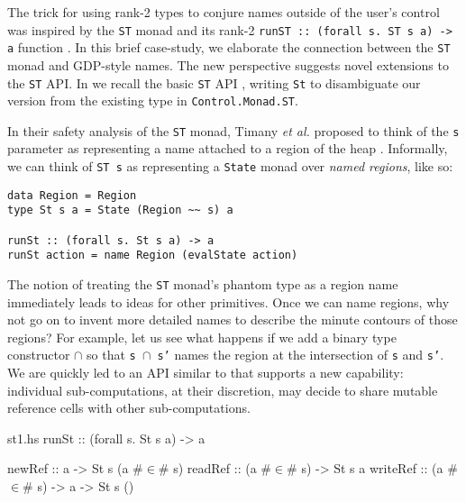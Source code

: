 \documentclass[format=sigplan, review=false, screen=true, 10pt]{acmart}
\makeatletter
\let\origsection\section
\renewcommand\section{\@ifstar{\starsection}{\nostarsection}}
\newcommand\nostarsection[1]
{\sectionprelude\origsection{#1}\sectionpostlude}
\newcommand\starsection[1]
{\sectionprelude\origsection*{#1}\sectionpostlude}
\newcommand\sectionprelude{%
  \vspace{-0.5em}
}
\newcommand\sectionpostlude{%
  \vspace{0em}
}
\makeatother
\begin{document}

\section{Case Study \#2: Sharing state threads}
The trick for using rank-2 types to conjure names outside of the user's control was
inspired by the \texttt{ST} monad and its rank-2 \texttt{runST :: (forall s. ST s a) -> a}
function \cite{launchbury1994lazy}. In this brief case-study, we elaborate the connection
between the \texttt{ST} monad and GDP-style names. The new perspective suggests novel
extensions to the \texttt{ST} API.
In  we recall the basic \texttt{ST} API \cite{launchbury1994lazy}, writing \texttt{St} to
disambiguate our version from the existing type in \texttt{Control.Monad.ST}.

In their safety analysis of the \texttt{ST} monad, Timany \textit{et al.} proposed to think of the \texttt{s} parameter as
representing a name attached to a region of the heap \cite{timany2017logical}.
Informally, we can think of \texttt{ST s} as representing a \texttt{State} monad over
\emph{named regions}, like so:
\begin{verbatim}
data Region = Region
type St s a = State (Region ~~ s) a

runSt :: (forall s. St s a) -> a
runSt action = name Region (evalState action)
\end{verbatim}

The notion of treating the \texttt{ST} monad's phantom type as a region name immediately leads to ideas for
other primitives. Once we can name regions, why not go on to invent more detailed names to describe
the minute contours of those regions? For example, let us see what happens if we add a binary type constructor $\cap$ so that \texttt{s $\cap$ s'}
names the region at the intersection of \texttt{s} and \texttt{s'}. We are quickly led to an API similar to  that
supports a new capability: individual sub-computations, at their discretion, may decide to share mutable reference cells with other sub-computations.



\begin{filecontents*}{st1.hs}
runSt    :: (forall s. St s a) -> a

newRef   :: a -> St s (a #$\in$# s)
readRef  :: (a #$\in$# s) -> St s a
writeRef :: (a #$\in$# s) -> a -> St s ()
\end{filecontents*}
\end{document}
